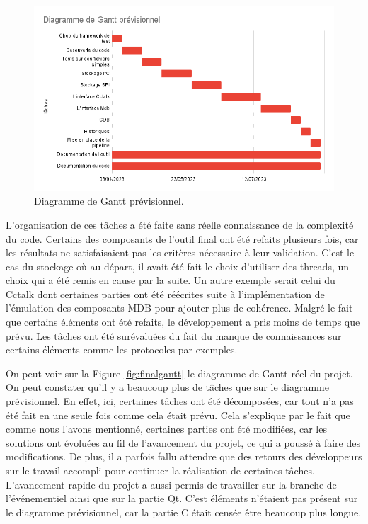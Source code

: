 \documentclass[a4paper]{article}
\begin{document}
\begin{figure}[h!]
  \begin{center}
  \includegraphics[scale=0.6]{./img/expected-gantt.png}
  \caption{Diagramme de Gantt prévisionnel.}
  \end{center}
  \label{fig:expectedgantt}
\end{figure}

L'organisation de ces tâches a été faite sans réelle connaissance de la
complexité du code. Certains des composants de l'outil final ont été refaits
plusieurs fois, car les résultats ne satisfaisaient pas les critères nécessaire
à leur validation. C'est le cas du stockage où au départ, il avait été fait le
choix d'utiliser des threads, un choix qui a été remis en cause par la suite. Un
autre exemple serait celui du Cctalk dont certaines parties ont été réécrites
suite à l'implémentation de l'émulation des composants MDB pour ajouter plus de
cohérence. Malgré le fait que certains éléments ont été refaits, le
développement a pris moins de temps que prévu. Les tâches ont été surévaluées du
fait du manque de connaissances sur certains éléments comme les protocoles par
exemples.

On peut voir sur la Figure \ref{fig:finalgantt} le diagramme de Gantt réel du
projet. On peut constater qu'il y a beaucoup plus de tâches que sur le diagramme
prévisionnel. En effet, ici, certaines tâches ont été décomposées, car tout n'a
pas été fait en une seule fois comme cela était prévu. Cela s'explique par le
fait que comme nous l'avons mentionné, certaines parties ont été modifiées, car
les solutions ont évoluées au fil de l'avancement du projet, ce qui a poussé à
faire des modifications. De plus, il a parfois fallu attendre que des retours
des développeurs sur le travail accompli pour continuer la réalisation de
certaines tâches. L'avancement rapide du projet a aussi permis de travailler sur
la branche de l'événementiel ainsi que sur la partie Qt. C'est éléments
n'étaient pas présent sur le diagramme prévisionnel, car la partie C était
censée être beaucoup plus longue.
\end{document}
